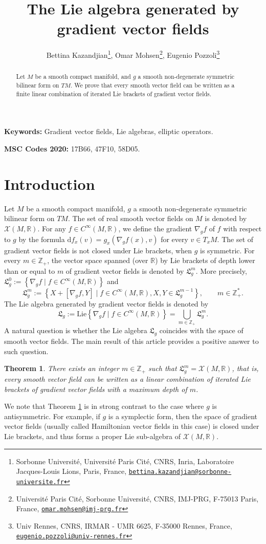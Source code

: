 \documentclass[10pt]{article}
\title{The Lie algebra generated by gradient vector fields}
\author{Bettina Kazandjian\footnote{Sorbonne Université, Université Paris Cité, CNRS, Inria, Laboratoire Jacques-Louis Lions, Paris, France, \href{mailto:bettina.kazandjian@sorbonne-universite.fr}{\texttt{bettina.kazandjian@sorbonne-universite.fr}}}, Omar Mohsen\footnote{Université Paris Cité, Sorbonne Université, CNRS, IMJ-PRG, F-75013 Paris, France, \href{mailto:omar.mohsen@imj-prg.fr}{\texttt{omar.mohsen@imj-prg.fr}}}, Eugenio Pozzoli\footnote{Univ Rennes, CNRS, IRMAR - UMR 6625, F-35000 Rennes, France, \href{mailto:eugenio.pozzoli@univ-rennes.fr}{\texttt{eugenio.pozzoli@univ-rennes.fr}}}}
\date{}
\newcommand{\R}{{\mathbb R}}
\newcommand{\Z}{{\mathbb Z}}
\newcommand{\Chi}{{\mathcal X}}
\newcommand{\LL}{{\mathfrak L}}
\newtheorem{thmx}{Theorem}
\begin{document}
\maketitle
\begin{abstract}
Let $M$ be a smooth compact manifold, and $g$ a smooth non-degenerate symmetric bilinear form on $TM$. We prove that every smooth vector field can be written as a finite linear combination of iterated Lie brackets of gradient vector fields.
\end{abstract}

\textbf{Keywords:} Gradient vector fields, Lie algebras, elliptic operators.

\textbf{MSC Codes 2020:} 17B66, 47F10, 58D05.

\section{Introduction}


Let $M$ be a smooth compact manifold, $g$ a smooth non-degenerate symmetric bilinear form on $TM$. The set of real smooth vector fields on $M$ is denoted by $\Chi(M,\R)$. For any $f \in C^{\infty}(M,\R)$, we define the gradient $\nabla_gf$ of $f$ with respect to $g$ by the formula $\mathrm{d}f_x(v)=g_x(\nabla_gf(x),v)$ for every $v\in T_xM$. The set of gradient vector fields is not closed under Lie brackets, when $g$ is symmetric. For every $m\in \Z_+$, the vector space spanned (over $\mathbb{R}$) by Lie brackets of depth lower than or equal to $m$ of gradient vector fields is denoted by $\LL_g^m$. More precisely, $\LL_g^0:=\left\{\nabla_gf \mid f\in C^\infty(M,\R)\right\}$ and
\begin{equation*}
    \LL_g^m:=\left\{X+[\nabla_gf,Y]\mid f\in C^{\infty}(M,\R),X,Y\in \LL_g^{m-1}\right\}, \qquad  m \in \Z_+^*.
\end{equation*}
The Lie algebra generated by gradient vector fields is denoted by
\begin{equation*}
    \LL_g:=\mathrm{Lie}\left\{\nabla_gf\mid f \in C^\infty(M,\R)\right\}=\bigcup_{m\in \mathbb{Z}_+}\LL_g^m.
\end{equation*}
A natural question is whether the Lie algebra $\LL_g$ coincides with the space of smooth vector fields. The main result of this article provides a positive answer to such question.
\begin{thmx}\label{theorem : main theorem}
    There exists an integer $m\in \Z_+$ such that $\LL_g^m=\Chi(M,\R)$, that is, every smooth vector field can be written as a linear combination of iterated Lie brackets of gradient vector fields with a maximum depth of $m$.
\end{thmx}
We note that Theorem \ref{theorem : main theorem} is in strong contrast to the case where $g$ is antisymmetric. For example, if $g$ is a symplectic form, then the space of gradient vector fields (usually called Hamiltonian vector fields in this case) is closed under Lie brackets, and thus forms a proper Lie sub-algebra  of $\Chi(M,\R)$.
\end{document}
